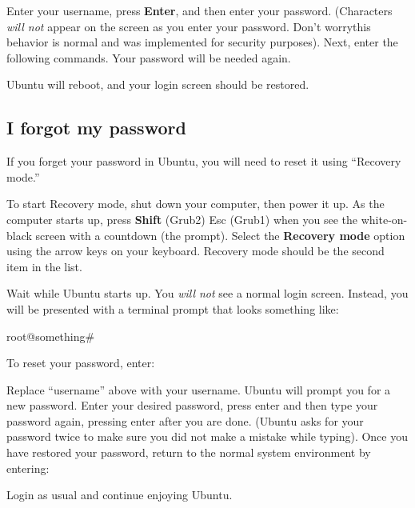 Enter your username, press \textbf{Enter}, and then enter your password. (Characters \textit{will not} appear on the screen as you enter your password. Don't worry\dash this behavior is normal and was implemented for security purposes).
Next, enter the following commands. Your password will be needed again.
\begin{terminal}
\prompt {}
\prompt {}
\prompt {}
\prompt {}
\prompt {}
\prompt {}
\end{terminal}
Ubuntu will reboot, and your login screen should be restored.

\subsection{I forgot my password}
If you forget your password in Ubuntu, you will need to reset it using ``Recovery mode.''

To start Recovery mode, shut down your computer, then power it up.
As the computer starts up, press \textbf{Shift} (Grub2) {Esc} (Grub1) when you see the white-on-black screen with a countdown (the  prompt).
Select the \textbf{Recovery mode} option using the arrow keys on your keyboard. Recovery mode should be the second item in the list.


Wait while Ubuntu starts up. You \textit{will not} see a normal login screen.
Instead, you will be presented with a terminal prompt that looks something like:
\begin{terminal}
root@something\#
\end{terminal}
To reset your password, enter:
\begin{terminal}
\prompt {}
\end{terminal}
Replace ``username'' above with your username.
Ubuntu will prompt you for a new password. 
Enter your desired password, press enter and then type your password again, pressing enter after you are done. (Ubuntu asks for your password twice to make sure you did not make a mistake while typing).
Once you have restored your password, return to the normal system environment by entering:
\begin{terminal}
\prompt {}
\end{terminal}
Login as usual and continue enjoying Ubuntu.


